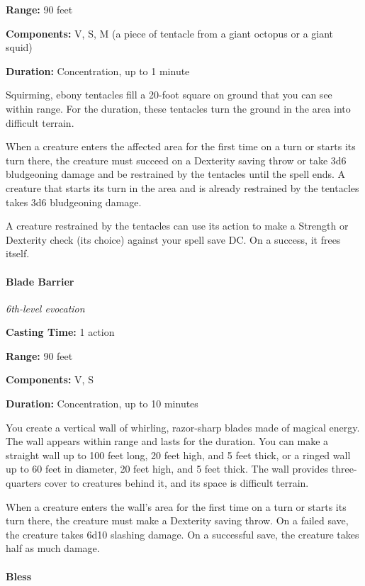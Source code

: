 \documentclass[
]{article}
\begin{document}
\textbf{Range:} 90 feet

\textbf{Components:} V, S, M (a piece of tentacle from a giant octopus
or a giant squid)

\textbf{Duration:} Concentration, up to 1 minute

Squirming, ebony tentacles fill a 20-foot square on ground that you can
see within range. For the duration, these tentacles turn the ground in
the area into difficult terrain.

When a creature enters the affected area for the first time on a turn or
starts its turn there, the creature must succeed on a Dexterity saving
throw or take 3d6 bludgeoning damage and be restrained by the tentacles
until the spell ends. A creature that starts its turn in the area and is
already restrained by the tentacles takes 3d6 bludgeoning damage.

A creature restrained by the tentacles can use its action to make a
Strength or Dexterity check (its choice) against your spell save DC. On
a success, it frees itself.

\hypertarget{blade-barrier}{%
\paragraph{Blade Barrier}\label{blade-barrier}}

\emph{6th-level evocation}

\textbf{Casting Time:} 1 action

\textbf{Range:} 90 feet

\textbf{Components:} V, S

\textbf{Duration:} Concentration, up to 10 minutes

You create a vertical wall of whirling, razor-sharp blades made of
magical energy. The wall appears within range and lasts for the
duration. You can make a straight wall up to 100 feet long, 20 feet
high, and 5 feet thick, or a ringed wall up to 60 feet in diameter, 20
feet high, and 5 feet thick. The wall provides three-quarters cover to
creatures behind it, and its space is difficult terrain.

When a creature enters the wall's area for the first time on a turn or
starts its turn there, the creature must make a Dexterity saving throw.
On a failed save, the creature takes 6d10 slashing damage. On a
successful save, the creature takes half as much damage.

\hypertarget{bless}{%
\paragraph{Bless}\label{bless}}
\end{document}
